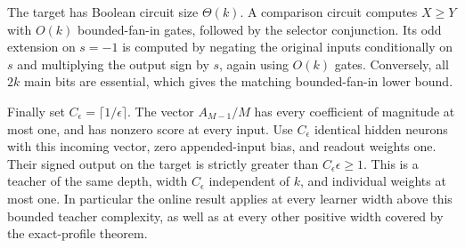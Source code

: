 The target has Boolean circuit size $\Theta(k)$. A comparison circuit
computes $X\ge Y$ with $O(k)$ bounded-fan-in gates, followed by the
selector conjunction. Its odd extension on $s=-1$ is computed by
negating the original inputs conditionally on $s$ and multiplying the
output sign by $s$, again using $O(k)$ gates. Conversely, all $2k$ main
bits are essential, which gives the matching bounded-fan-in lower bound.

Finally set $C_\epsilon=\lceil1/\epsilon\rceil$. The vector $A_{M-1}/M$
has every coefficient of magnitude at most one, and has nonzero score
at every input. Use $C_\epsilon$ identical hidden neurons with this
incoming vector, zero appended-input bias, and readout weights one.
Their signed output on the target is strictly greater than
$C_\epsilon\epsilon\ge1$. This is a teacher of the same depth, width
$C_\epsilon$ independent of $k$, and individual weights at most one.
In particular the online result applies at every learner width above
this bounded teacher complexity, as well as at every other positive
width covered by the exact-profile theorem.
